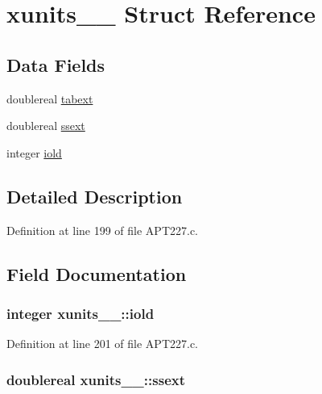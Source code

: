 \hypertarget{structxunits__1__}{}\section{xunits\+\_\+\_\+ Struct Reference}
\label{structxunits__1__}
\subsection*{Data Fields}
\begin{DoxyCompactItemize}
\item 
doublereal \hyperlink{structxunits__1___ae1da3fd895454b4eafbd24cfbb3e42ba}{tabext}
\item 
doublereal \hyperlink{structxunits__1___a7762fcee72620e073506479b16a44ce8}{ssext}
\item 
integer \hyperlink{structxunits__1___a6074d587fa2e1700e884da622323e4d2}{iold}
\end{DoxyCompactItemize}


\subsection{Detailed Description}


Definition at line 199 of file A\+P\+T227.\+c.



\subsection{Field Documentation}
\subsubsection[{\texorpdfstring{iold}{iold}}]{\setlength{\rightskip}{0pt plus 5cm}integer xunits\+\_\+\_\+\+::iold}\hypertarget{structxunits__1___a6074d587fa2e1700e884da622323e4d2}{}\label{structxunits__1___a6074d587fa2e1700e884da622323e4d2}


Definition at line 201 of file A\+P\+T227.\+c.

\subsubsection[{\texorpdfstring{ssext}{ssext}}]{\setlength{\rightskip}{0pt plus 5cm}doublereal xunits\+\_\+\_\+\+::ssext}\hypertarget{structxunits__1___a7762fcee72620e073506479b16a44ce8}{}\label{structxunits__1___a7762fcee72620e073506479b16a44ce8}


